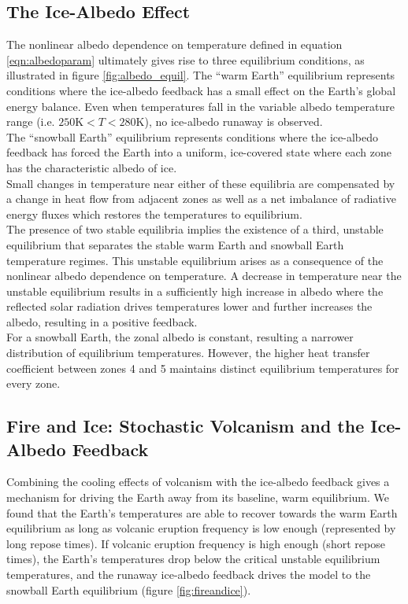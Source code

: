 \documentclass[12pt]{article}
\begin{document}
\subsection{The Ice-Albedo Effect}
The nonlinear albedo dependence on temperature defined in equation
\ref{eqn:albedoparam} ultimately gives rise to three equilibrium
conditions, as illustrated in figure \ref{fig:albedo_equil}. The ``warm Earth''
equilibrium represents conditions where the ice-albedo feedback has a small
effect on the Earth's global energy balance. Even when
temperatures fall in the variable albedo temperature range
(i.e. $250 \text{K} < T < 280 \text{K}$), no ice-albedo runaway is observed. \\

The ``snowball Earth'' equilibrium represents conditions where the ice-albedo
feedback has forced the Earth into a uniform, ice-covered state where each
zone has the characteristic albedo of ice. \\

Small changes in temperature near either of these equilibria are
compensated by a change in heat flow from adjacent
zones as well as a net imbalance of radiative energy fluxes which 
restores the temperatures to equilibrium. \\

The presence of two stable equilibria implies the existence of a third, unstable
equilibrium that separates the stable warm Earth and snowball Earth temperature
regimes. This unstable equilibrium arises as a consequence of the nonlinear albedo
dependence on temperature. A decrease in temperature near the unstable equilibrium
results in a sufficiently high increase in albedo where the reflected solar radiation
drives temperatures lower and further increases the albedo, resulting in a positive
feedback. \\

For a snowball Earth, the zonal albedo is constant, resulting a narrower
distribution of equilibrium temperatures. However, the higher heat transfer
coefficient between zones 4 and 5 maintains distinct equilibrium temperatures
for every zone.

\subsection{Fire and Ice: Stochastic Volcanism and the Ice-Albedo Feedback}
\label{sec:snowballearth}
Combining the cooling effects of volcanism with the ice-albedo feedback gives
a mechanism for driving the Earth away from its baseline, warm equilibrium.
We found that the Earth's temperatures are able to recover towards the warm Earth
equilibrium as long as volcanic eruption frequency
is low enough (represented by long repose times). If volcanic eruption
frequency is high enough (short repose times), the Earth's
temperatures drop below the critical unstable equilibrium temperatures, and
the runaway ice-albedo feedback drives the model to the snowball Earth equilibrium
(figure \ref{fig:fireandice}). \\
\end{document}
